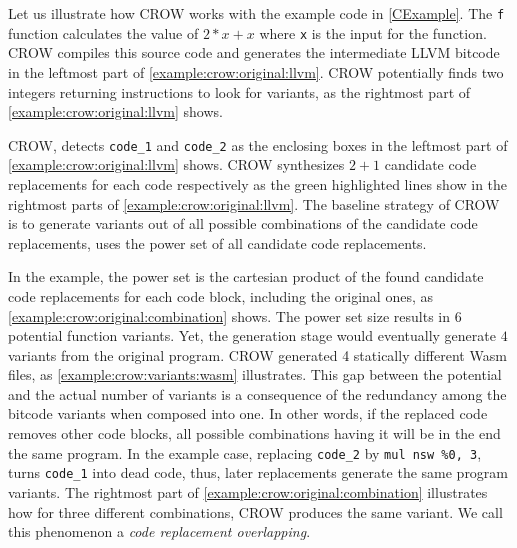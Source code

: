\label{section:crow:example}

Let us illustrate how CROW works with the example code in \autoref{CExample}. The \texttt{f} function calculates the value of $2 * x + x$ where \texttt{x} is the input for the function.  CROW compiles this source code and generates the intermediate LLVM bitcode in the leftmost part of \autoref{example:crow:original:llvm}. CROW potentially finds two integers returning instructions to look for variants, as the rightmost part of \autoref{example:crow:original:llvm} shows.


    

CROW, detects \texttt{code\_1} and \texttt{code\_2} as the enclosing boxes in the leftmost part of \autoref{example:crow:original:llvm} shows. CROW synthesizes $2 + 1$ candidate code replacements for each code respectively as the green highlighted lines show in the rightmost parts of \autoref{example:crow:original:llvm}.
The baseline strategy of CROW is to generate variants out of all possible combinations of the candidate code replacements, \ie uses the power set of all candidate code replacements.

In the example, the power set is the cartesian product of the found candidate code replacements for each code block, including the original ones, as \autoref{example:crow:original:combination} shows. The power set size results in $6$ potential function variants. Yet, the generation stage would eventually generate $4$ variants from the original program. CROW generated 4 statically different Wasm files, as \autoref{example:crow:variants:wasm} illustrates. This gap between the potential and the actual number of variants is a consequence of the redundancy among the bitcode variants when composed into one. In other words, if the replaced code removes other code blocks, all possible combinations having it will be in the end the same program. In the example case, replacing \texttt{code\_2} by \texttt{mul nsw \%0, 3}, turns \texttt{code\_1} into dead code, thus, later replacements generate the same program variants. The rightmost part of \autoref{example:crow:original:combination} illustrates how for three different combinations, CROW produces the same variant. We call this phenomenon a \emph{code replacement overlapping}.

